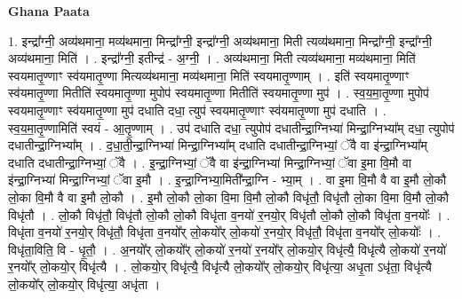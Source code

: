 \documentclass[17pt]{extarticle}
\begin{document}
\textbf{Ghana Paata } \newline

1. इन्द्रा᳚ग्नी॒ अव्य॑थमाना॒ मव्य॑थमाना॒ मिन्द्रा᳚ग्नी॒ इन्द्रा᳚ग्नी॒ अव्य॑थमाना॒ मिती त्यव्य॑थमाना॒ मिन्द्रा᳚ग्नी॒ इन्द्रा᳚ग्नी॒ अव्य॑थमाना॒ मिति॑ । . इन्द्रा᳚ग्नी॒ इतीन्द्र॑ - अ॒ग्नी॒ । . अव्य॑थमाना॒ मिती त्यव्य॑थमाना॒ मव्य॑थमाना॒ मिति॑ स्वयमातृ॒ण्णाꣳ स्व॑यमातृ॒ण्णा मित्यव्य॑थमाना॒ मव्य॑थमाना॒ मिति॑ स्वयमातृ॒ण्णाम् । . इति॑ स्वयमातृ॒ण्णाꣳ स्व॑यमातृ॒ण्णा मितीति॑ स्वयमातृ॒ण्णा मुपोप॑ स्वयमातृ॒ण्णा मितीति॑ स्वयमातृ॒ण्णा मुप॑ । . स्व॒य॒मा॒तृ॒ण्णा मुपोप॑ स्वयमातृ॒ण्णाꣳ स्व॑यमातृ॒ण्णा मुप॑ दधाति दधा॒ त्युप॑ स्वयमातृ॒ण्णाꣳ स्व॑यमातृ॒ण्णा मुप॑ दधाति । . स्व॒य॒मा॒तृ॒ण्णामिति॑ स्वयं - आ॒तृ॒ण्णाम् । . उप॑ दधाति दधा॒ त्युपोप॑ दधातीन्द्रा॒ग्निभ्या॑ मिन्द्रा॒ग्निभ्या᳚म् दधा॒ त्युपोप॑ दधातीन्द्रा॒ग्निभ्या᳚म् । . द॒धा॒ती॒न्द्रा॒ग्निभ्या॑ मिन्द्रा॒ग्निभ्या᳚म् दधाति दधातीन्द्रा॒ग्निभ्यां॒ ॅवै वा इ॑न्द्रा॒ग्निभ्या᳚म् दधाति 
दधातीन्द्रा॒ग्निभ्यां॒ ॅवै । . इ॒न्द्रा॒ग्निभ्यां॒ ॅवै वा इ॑न्द्रा॒ग्निभ्या॑ मिन्द्रा॒ग्निभ्यां॒ ॅवा इ॒मा वि॒मौ वा इ॑न्द्रा॒ग्निभ्या॑ मिन्द्रा॒ग्निभ्यां॒ ॅवा इ॒मौ । . इ॒न्द्रा॒ग्निभ्या॒मिती᳚न्द्रा॒ग्नि - भ्या॒म् । . वा इ॒मा वि॒मौ वै वा इ॒मौ लो॒कौ लो॒का वि॒मौ वै वा इ॒मौ लो॒कौ । . इ॒मौ लो॒कौ लो॒का वि॒मा वि॒मौ लो॒कौ विधृ॑तौ॒ विधृ॑तौ लो॒का वि॒मा वि॒मौ लो॒कौ विधृ॑तौ । . लो॒कौ विधृ॑तौ॒ विधृ॑तौ लो॒कौ लो॒कौ विधृ॑ता व॒नयो॑ र॒नयो॒र् विधृ॑तौ लो॒कौ लो॒कौ विधृ॑ता व॒नयोः᳚ । . विधृ॑ता व॒नयो॑ र॒नयो॒र् विधृ॑तौ॒ विधृ॑ता व॒नयो᳚र् लो॒कयो᳚र् लो॒कयो॑ र॒नयो॒र् विधृ॑तौ॒ विधृ॑ता व॒नयो᳚र् लो॒कयोः᳚ । . विधृ॑ता॒विति॒ वि - धृ॒तौ॒ । . अ॒नयो᳚र् लो॒कयो᳚र् लो॒कयो॑ र॒नयो॑ र॒नयो᳚र् लो॒कयो॒र् विधृ॑त्यै॒ विधृ॑त्यै लो॒कयो॑ र॒नयो॑ र॒नयो᳚र् लो॒कयो॒र् विधृ॑त्यै । . लो॒कयो॒र् विधृ॑त्यै॒ विधृ॑त्यै लो॒कयो᳚र् लो॒कयो॒र् विधृ॑त्या॒ अधृ॒ता ऽधृ॑ता॒ विधृ॑त्यै लो॒कयो᳚र् लो॒कयो॒र् विधृ॑त्या॒ अधृ॑ता । \newline
\end{document}
